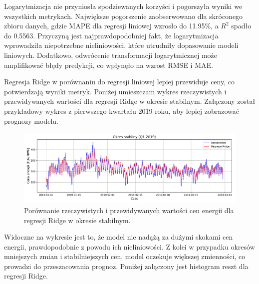 Logarytmizacja nie przyniosła spodziewanych korzyści i pogorszyła wyniki we wszystkich metrykach. Największe pogorszenie zaobserwowano dla skróconego zbioru danych, gdzie MAPE dla regresji liniowej wzrosło do 11.95\%, a \(R^2\) spadło do 0.5563. Przyczyną jest najprawdopodobniej fakt, że logarytmizacja wprowadziła niepotrzebne nieliniowości, które utrudniły dopasowanie modeli liniowych. Dodatkowo, odwrócenie transformacji logarytmicznej może amplifikować błędy predykcji, co wpłynęło na wzrost RMSE i MAE.

Regresja Ridge w porównaniu do regresji liniowej lepiej przewiduje ceny, co potwierdzają wyniki metryk. Poniżej umieszczam wykres rzeczywistych i przewidywanych wartości dla regresji Ridge w okresie stabilnym. Załączony został przykładowy wykres z pierwszego kwartału 2019 roku, aby lepiej zobrazować prognozy modelu.

\begin{figure}[H]
    \centering
    \includegraphics[width=1.0\textwidth]{../../plots/predicts/ridge_predictions_full_q1_2019.png}
    \caption{Porównanie rzeczywistych i przewidywanych wartości cen energii dla regresji Ridge w okresie stabilnym.}
    \label{fig:ridge_predictions_full_stable_period}
\end{figure}

Widoczne na wykresie jest to, że model nie nadążą za dużymi skokami cen energii, prawdopodobnie z powodu ich nieliniowości. Z kolei w przypadku okresów mniejszych zmian i stabilniejszych cen, model oczekuje większej zmienności, co prowadzi do przeszacowania prognoz. Poniżej załączony jest histogram reszt dla regresji Ridge.

